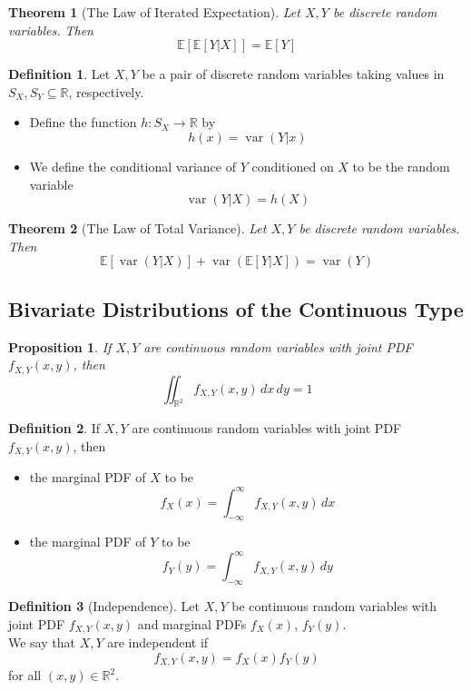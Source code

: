 \documentclass[
]{article}
\newtheorem{theorem}{Theorem}[section]
\newtheorem{proposition}{Proposition}[section]
\theoremstyle{definition}
\newtheorem{definition}{Definition}[section]
\theoremstyle{definition}
\theoremstyle{definition}
\theoremstyle{remark}
\newcommand{\fxx}{f_X(x)}
\newcommand{\E}[1]{\mathbb{E}[#1]}
\newcommand{\var}[1]{\operatorname{var}\left(#1\right)}
\begin{document}
\begin{theorem}[The Law of Iterated Expectation]
  Let $X, Y$ be discrete random variables. Then \[\E{\E{Y|X}} = \E{Y}\]
\end{theorem}

\begin{definition}
  Let $X, Y$ be a pair of discrete random variables taking values in $S_X, S_Y \subseteq \mathbb{R}$, respectively.
  \begin{itemize}
    \item Define the function $h:S_X \rightarrow \mathbb{R}$ by \[h(x) = \var{Y|x}\]
    \item We define the conditional variance of $Y$ conditioned on $X$ to be the random variable \[\var{Y|X} = h(X)\]
  \end{itemize}
\end{definition}

\begin{theorem}[The Law of Total Variance]
  Let $X, Y$ be discrete random variables. Then \[\E{\var{Y|X}} + \var{\E{Y|X}} = \var{Y}\]
\end{theorem}

\subsection{Bivariate Distributions of the Continuous Type}

\begin{proposition}
  If $X, Y$ are continuous random variables with joint PDF $f_{X,Y}(x,y)$, then
  \[
    \iint_{\mathbb{R}^2} f_{X,Y}(x,y) \,dx\,dy = 1
  \]
\end{proposition}

\begin{definition}
  If $X, Y$ are continuous random variables with joint PDF $f_{X,Y}(x,y)$, then
  \begin{itemize}
    \item the marginal PDF of $X$ to be \[\fxx = \int_{-\infty}^{\infty} f_{X,Y}(x,y) \,dx \]
    \item the marginal PDF of $Y$ to be \[f_Y(y) = \int_{-\infty}^{\infty} f_{X,Y}(x,y) \,dy \]
  \end{itemize}
\end{definition}

\begin{definition}[Independence]
  Let $X, Y$ be continuous random variables with joint PDF $f_{X,Y}(x,y)$ and marginal PDFs $\fxx$, $f_Y(y)$. \\
  We say that $X, Y$ are independent if \[ f_{X,Y}(x,y) = \fxx f_Y(y)\] for all $(x, y) \in \mathbb{R}^2$.
\end{definition}
\end{document}
